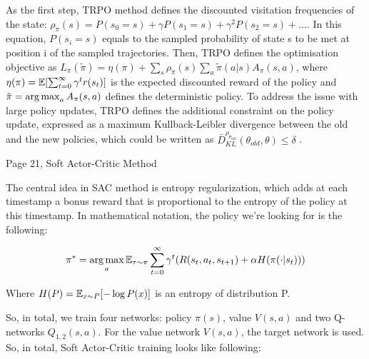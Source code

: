 As the first step, TRPO method defines the discounted visitation frequencies of
the state: \begin{math}\rho_\pi(s)=P(s_0=s)+\gamma P(s_1=s)+\gamma^2 P(s_2=s)+\ldots\end{math}.
In this equation, \begin{math}P(s_i=s)\end{math} equals to the sampled
probability of state s to be met at position i of the sampled trajectories.
Then, TRPO defines the optimisation objective as
\begin{math}L_\pi(\tilde{\pi})=\eta(\pi) +
  \sum_s\rho_\pi(s)\sum_a\tilde{\pi}(a|s)A_\pi(s, a)\end{math},
where \begin{math}\eta(\pi)=\operatorname{\mathbb{E}}[\sum_{t=0}^{\infty}\gamma^t r(s_t)]\end{math} is
the expected discounted reward of the policy and
\begin{math}\tilde{\pi}=\operatorname*{arg\,max}_aA_\pi(s, a)\end{math} defines the deterministic policy.
To address the issue with large policy updates, TRPO defines the additional
constraint on the policy update, expressed as a maximum Kullback-Leibler
divergence between the old and the new policies, which could be written as
\begin{math}\bar{D}_{KL}^{\rho_{\theta_{old}}}(\theta_{old},\theta) \leq \delta\end{math}
.

Page 21, Soft Actor-Critic Method

The central idea in SAC method is entropy regularization, which adds at each timestamp a bonus reward that is proportional to the entropy of the policy at this timestamp. In mathematical notation, the policy we’re looking for is the following:

\begin{equation*}
\pi^* = \operatorname*{arg\,max}\limits_a \operatorname{\mathbb{E}}_{\tau \sim \pi} \sum_{t=0}^{\infty}\gamma^t(R(s_t, a_t, s_{t+1}) +
\alpha H(\pi(\cdot | s_t)))
\end{equation*}

Where \begin{math}H(P) = \operatorname{\mathbb{E}}_{x \sim P}[-\log P(x)]\end{math} is an entropy of distribution P.

So, in total, we train four networks: policy \begin{math}\pi(s)\end{math}, value
\begin{math}V(s, a)\end{math} and two Q-networks \begin{math}Q_{1,2}(s,a)\end{math}.
For the value network \begin{math}V(s, a)\end{math}, the target network is used. So, in total, Soft Actor-Critic training looks like following:

